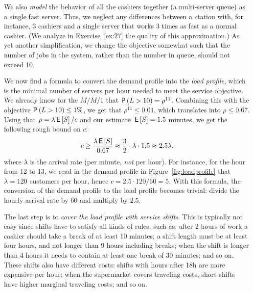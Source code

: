 We also \emph{model} the behavior of all the cashiers together (a multi-server queue) as a single fast server.
Thus, we neglect any differences between a station with, for instance, 3 cashiers and a single server that works 3 times as fast as a normal cashier.
(We analyze in Exercise~\ref{ex:27} the quality of this approximation.)
As yet another simplification, we change the objective somewhat such that the number of jobs in the system, rather than the number in queue, should not exceed 10.

We now find a formula to convert the demand profile into the \emph{load profile}, which is the minimal number of servers per hour needed to meet the service objective. We already know for the $M/M/1$ that $\P{L>10}=\rho^{11}$.  Combining this with the objective $\P{L>10}\leq 1\%$, we get that $\rho^{11}\leq 0.01$, which  translates into $\rho \leq 0.67$. Using that $\rho = \lambda \,\mathsf{E}\left[S\right]/c$ and our estimate $\,\mathsf{E}\left[S\right]=1.5$ minutes,  we get  the following rough bound on $c$:
\begin{equation*}
c \geq \frac{\lambda \,\mathsf{E}\left[S\right]}{0.67} \approx \frac{3}2 \cdot \lambda \cdot 1.5  \approx 2.5 \lambda,
\end{equation*}
where $\lambda$ is the arrival rate (per minute, \emph{not} per hour).
For instance, for the hour from 12 to 13, we read in  the demand profile in Figure~\ref{fig:loadprofile} that $\lambda= 120$ customers per hour, hence $c=2.5 \cdot 120/60 = 5$. With this formula, the conversion of the demand profile to the load profile becomes trivial: divide the hourly arrival rate by $60$ and multiply by
$2.5$.

The last step is to \emph{cover the load profile with service shifts}. This
is typically not easy since shifts have to satisfy all kinds of rules,
such as: after 2 hours of work a cashier should take a break of at least
10 minutes; a shift length must be at least four hours, and not longer
than 9 hours including breaks; when the shift is longer than 4 hours
it needs to contain at least one break of 30 minutes; and so on. These
shifts also have different costs: shifts with hours after 18h
are more expensive per hour; when the supermarket covers traveling
costs, short shifts have higher marginal traveling costs; and so on.

